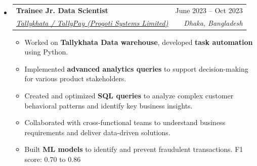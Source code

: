 \documentclass[10pt, a4paper]{article}
\makeatletter
\newcommand{\resumeItem}[1]{
  \item\small{
    {#1 \vspace{-2pt}}
  }
}
\newcommand{\resumeSubheading}[4]{
  \vspace{-2pt}\item
    \begin{tabular*}{\linewidth}[t]{@{}l@{\extracolsep{\fill}}r@{}}
      \textbf{#1} & \small#2 \\
      \textit{\small#3} & \textit{\footnotesize #4} \\
    \end{tabular*}\vspace{-7pt}
}
\makeatother
\begin{document}
\begin{itemize}[leftmargin=0.02in, label={}]
    \resumeSubheading
      {Trainee Jr. Data Scientist}{June 2023 -- Oct 2023}
      {\href{https://www.tallykhata.com/en/home-eng/}{Tallykhata / TallyPay (Progoti Systems Limited)}}{Dhaka, Bangladesh}
      \begin{itemize}
        \resumeItem{Worked on \textbf{Tallykhata Data warehouse}, developed \textbf{task automation} using Python.}
        \resumeItem{Implemented \textbf{advanced analytics queries} to support decision-making for various product stakeholders.}
        \resumeItem{Created and optimized \textbf{SQL queries} to analyze complex customer behavioral patterns and identify key business insights.}
        \resumeItem{Collaborated with cross-functional teams to understand business requirements and deliver data-driven solutions.}
        \resumeItem{Built \textbf{ML models} to identify and prevent fraudulent transactions. F1 score: 0.70 to 0.86}
      \end{itemize}

  \end{itemize}

\end{document}
